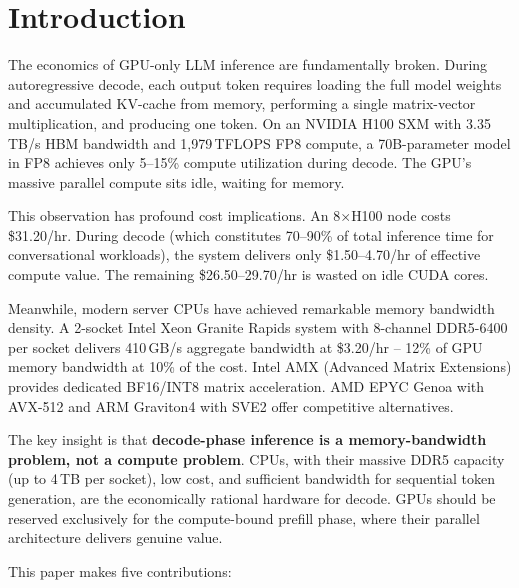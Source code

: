 \documentclass[conference,10pt]{IEEEtran}
\begin{document}
\section{Introduction}

The economics of GPU-only LLM inference are fundamentally broken. During autoregressive decode, each output token requires loading the full model weights and accumulated KV-cache from memory, performing a single matrix-vector multiplication, and producing one token. On an NVIDIA H100 SXM with 3.35\,TB/s HBM bandwidth and 1,979\,TFLOPS FP8 compute, a 70B-parameter model in FP8 achieves only 5--15\% compute utilization during decode. The GPU's massive parallel compute sits idle, waiting for memory.

This observation has profound cost implications. An 8$\times$H100 node costs \$31.20/hr. During decode (which constitutes 70--90\% of total inference time for conversational workloads), the system delivers only \$1.50--4.70/hr of effective compute value. The remaining \$26.50--29.70/hr is wasted on idle CUDA cores.

Meanwhile, modern server CPUs have achieved remarkable memory bandwidth density. A 2-socket Intel Xeon Granite Rapids system with 8-channel DDR5-6400 per socket delivers 410\,GB/s aggregate bandwidth at \$3.20/hr -- 12\% of GPU memory bandwidth at 10\% of the cost. Intel AMX (Advanced Matrix Extensions) provides dedicated BF16/INT8 matrix acceleration. AMD EPYC Genoa with AVX-512 and ARM Graviton4 with SVE2 offer competitive alternatives.

The key insight is that \textbf{decode-phase inference is a memory-bandwidth problem, not a compute problem}. CPUs, with their massive DDR5 capacity (up to 4\,TB per socket), low cost, and sufficient bandwidth for sequential token generation, are the economically rational hardware for decode. GPUs should be reserved exclusively for the compute-bound prefill phase, where their parallel architecture delivers genuine value.

This paper makes five contributions:
\end{document}

